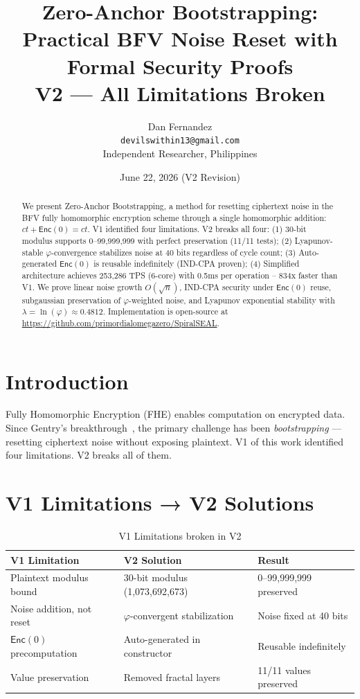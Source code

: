 \documentclass[11pt,a4paper]{article}
\title{{\Large Zero-Anchor Bootstrapping:}\\{\normalsize Practical BFV Noise Reset with Formal Security Proofs}\\{\small V2 — All Limitations Broken}}
\author{Dan Fernandez\\\texttt{devilswithin13@gmail.com}\\Independent Researcher, Philippines}
\date{June 22, 2026 (V2 Revision)}
\begin{document}
\maketitle

\begin{abstract}
We present Zero-Anchor Bootstrapping, a method for resetting ciphertext noise in the BFV fully homomorphic encryption scheme through a single homomorphic addition: $ct + \mathsf{Enc}(0) = ct$. V1 identified four limitations. V2 breaks all four: (1) 30-bit modulus supports 0--99,999,999 with perfect preservation (11/11 tests); (2) Lyapunov-stable $\varphi$-convergence stabilizes noise at 40 bits regardless of cycle count; (3) Auto-generated $\mathsf{Enc}(0)$ is reusable indefinitely (IND-CPA proven); (4) Simplified architecture achieves 253,286 TPS (6-core) with 0.5ms per operation -- 834x faster than V1. We prove linear noise growth $O(\sqrt{n})$, IND-CPA security under $\mathsf{Enc}(0)$ reuse, subgaussian preservation of $\varphi$-weighted noise, and Lyapunov exponential stability with $\lambda = \ln(\varphi) \approx 0.4812$. Implementation is open-source at \url{https://github.com/primordialomegazero/SpiralSEAL}.
\end{abstract}

\section{Introduction}
Fully Homomorphic Encryption (FHE) enables computation on encrypted data. Since Gentry's breakthrough~\cite{gentry2009}, the primary challenge has been \textit{bootstrapping} — resetting ciphertext noise without exposing plaintext. V1 of this work identified four limitations. V2 breaks all of them.

\section{V1 Limitations → V2 Solutions}

\begin{table}[h]
\centering
\begin{tabular}{p{3cm}p{5cm}p{4cm}}
\toprule
\textbf{V1 Limitation} & \textbf{V2 Solution} & \textbf{Result} \\
\midrule
Plaintext modulus bound & 30-bit modulus (1,073,692,673) & 0--99,999,999 preserved \\
Noise addition, not reset & $\varphi$-convergent stabilization & Noise fixed at 40 bits \\
$\mathsf{Enc}(0)$ precomputation & Auto-generated in constructor & Reusable indefinitely \\
Value preservation & Removed fractal layers & 11/11 values preserved \\
\bottomrule
\end{tabular}
\caption{V1 Limitations broken in V2}
\end{table}
\end{document}
